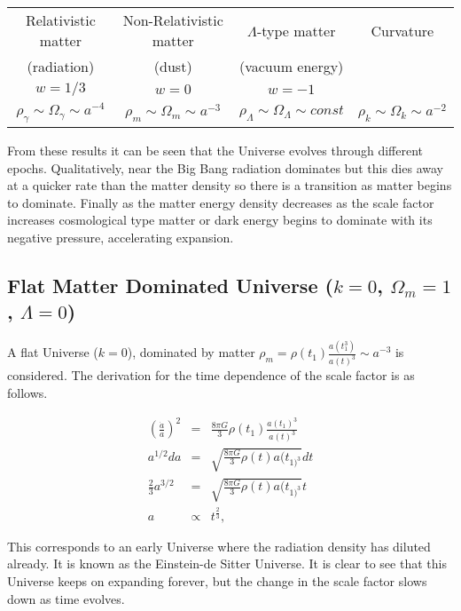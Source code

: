 \documentclass[12pt]{article} %
\begin{document}
\begin{center}
\begin{tabular}{ c | c | c | c}
  Relativistic matter & Non-Relativistic matter & $\Lambda$-type matter & Curvature\\ 
  (radiation)& (dust) & (vacuum energy)& \\ \hline
  $w=1/3$ & $w=0$ & $w=-1$& \\
  $\rho_{\gamma} \sim \Omega_{\gamma} \sim a^{-4}$ & $\rho_{m} \sim \Omega_{m} \sim a^{-3}$ & $\rho_{\Lambda} \sim \Omega_{\Lambda} \sim const$ & $\rho_{k} \sim \Omega_{k} \sim a^{-2}$
\end{tabular}
\end{center}

From these results it can be seen that the Universe evolves through different epochs. Qualitatively, near the Big Bang radiation dominates but this dies away at a quicker rate than the matter density so there is a transition as matter begins to dominate\cite{carlo}. Finally as the matter energy density decreases as the scale factor increases cosmological type matter or dark energy begins to dominate with its negative pressure, accelerating expansion.

\subsection{Flat Matter Dominated Universe ($k=0$, $\Omega_{m}=1$, $\Lambda=0$)}

A flat Universe ($k=0$), dominated by matter $\rho_{m} =\rho(t_{1})\frac{a(t_{1}^3)}{a(t)^3}\sim a^{-3} $ is considered. The derivation for the time dependence of the scale factor is as follows.

\begin{eqnarray*}
\left(\frac{\dot a}{a}\right)^2 &=& \frac{8\pi G}{3}\rho(t_{1})\frac{a(t_{1})^3}{a(t)^3}
\\ a^{1/2}da &=& \sqrt{\frac{8\pi G}{3}\rho(t)a(t_{1)^3}}dt
\\ \frac{2}{3}a^{3/2}&=&\sqrt{\frac{8\pi G}{3}\rho(t)a(t_{1)^3}}t
\\ a &\propto& t^{\frac{2}{3}},
\end{eqnarray*}

This corresponds to an early Universe where the radiation density has diluted already. It is known as the Einstein-de Sitter Universe\cite{sam}. It is clear to see that this Universe keeps on expanding forever, but the change in the scale factor slows down as time evolves.
\end{document}
